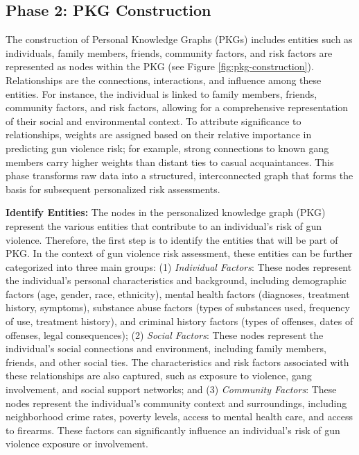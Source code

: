 \documentclass[11pt]{article}
\begin{document}
\subsection*{Phase 2: PKG Construction}
The construction of Personal Knowledge Graphs (PKGs) includes entities such as individuals, family members, friends, community factors, and risk factors are represented as nodes within the PKG (see Figure \ref{fig:pkg-construction}). Relationships are the connections, interactions, and influence among these entities. For instance, the individual is linked to family members, friends, community factors, and risk factors, allowing for a comprehensive representation of their social and environmental context. To attribute significance to relationships, weights are assigned based on their relative importance in predicting gun violence risk; for example, strong connections to known gang members carry higher weights than distant ties to casual acquaintances. This phase transforms raw data into a structured, interconnected graph that forms the basis for subsequent personalized risk assessments.

\textbf{Identify Entities: }The nodes in the personalized knowledge graph (PKG) represent the various entities that contribute to an individual's risk of gun violence. Therefore, the first step is to identify the entities that will be part of PKG. In the context of gun violence risk assessment, these entities can be further categorized into three main groups: (1) \textit{Individual Factors}: These nodes represent the individual's personal characteristics and background, including demographic factors (age, gender, race, ethnicity), mental health factors (diagnoses, treatment history, symptoms), substance abuse factors (types of substances used, frequency of use, treatment history), and criminal history factors (types of offenses, dates of offenses, legal consequences); (2) \textit{Social Factors}: These nodes represent the individual's social connections and environment, including family members, friends, and other social ties. The characteristics and risk factors associated with these relationships are also captured, such as exposure to violence, gang involvement, and social support networks; and (3) \textit{Community Factors}: These nodes represent the individual's community context and surroundings, including neighborhood crime rates, poverty levels, access to mental health care, and access to firearms. These factors can significantly influence an individual's risk of gun violence exposure or involvement.
\end{document}
